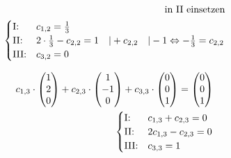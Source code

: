 \begin{align*}
    \text{in II einsetzen}                                                                                                    \\
    \begin{cases}
        \text{I:\@}   & c_{1,2} = \frac{1}{3}                                                                                     \\
        \text{II:\@}  & 2 \cdot \frac{1}{3} - c_{2, 2} = 1 \quad | + c_{2, 2}  \quad | -1 \Leftrightarrow -\frac{1}{3} = c_{2, 2} \\
        \text{III:\@} & c_{3,2} = 0
    \end{cases} \\
\end{align*}

\begin{align*}
    c_{1,3} \cdot \begin{pmatrix}
                      1 \\ 2 \\ 0
                  \end{pmatrix} + c_{2, 3} \cdot \begin{pmatrix}
                                                     1 \\ -1 \\ 0
                                                 \end{pmatrix} + c_{3, 3} \cdot \begin{pmatrix}
                                                                                    0 \\ 0 \\ 1
                                                                                \end{pmatrix} = \begin{pmatrix}
                                                                                                    0 \\ 0 \\ 1
                                                                                                \end{pmatrix} \\
    \begin{cases}
        \text{I:\@}   & c_{1,3} + c_{2,3} = 0  \\
        \text{II:\@}  & 2c_{1,3} - c_{2,3} = 0 \\
        \text{III:\@} & c_{3,3} = 1
    \end{cases}                                                                     \\

\end{align*}
